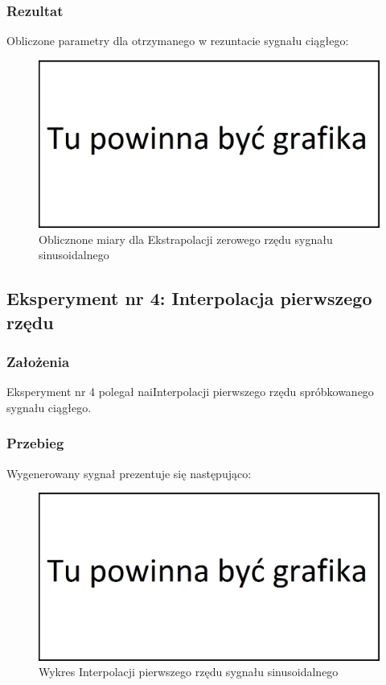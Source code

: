 \documentclass[12pt]{article}
\begin{document}
\subsubsection{Rezultat}
Obliczone parametry dla otrzymanego w rezuntacie sygnału ciągłego:
\begin{figure}[H]
    \centering
	\includegraphics[width=\linewidth]{tmp.jpg}
    \caption{Oblicznone miary dla Ekstrapolacji zerowego rzędu sygnału sinusoidalnego}
    \label{wartości dla eksperymentu 3}
\end{figure}



\newpage
\subsection{Eksperyment nr 4: Interpolacja pierwszego rzędu}

\subsubsection{Założenia}
Eksperyment nr 4 polegał naiInterpolacji pierwszego rzędu spróbkowanego sygnału ciągłego.
\subsubsection{Przebieg}
Wygenerowany sygnał prezentuje się następująco:
\begin{figure}[H]
	\centering
	\includegraphics[width=\linewidth]{tmp.jpg}
	\caption{Wykres Interpolacji pierwszego rzędu sygnału sinusoidalnego}
	\label{wykres dla eksperymentu 4}
\end{figure}
\end{document}
